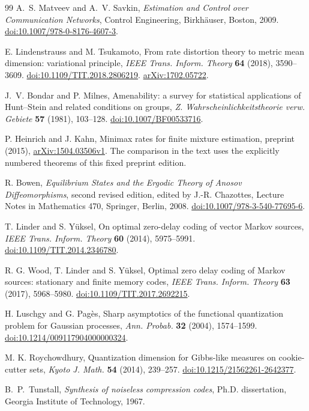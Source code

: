 \begin{thebibliography}{99}
A.~S. Matveev and A.~V. Savkin, \emph{Estimation and Control over
Communication Networks}, Control Engineering, Birkh\"auser, Boston, 2009.
\href{https://doi.org/10.1007/978-0-8176-4607-3}{doi:10.1007/978-0-8176-4607-3}.

E. Lindenstrauss and M. Tsukamoto, From rate distortion theory to
metric mean dimension: variational principle,
\emph{IEEE Trans. Inform. Theory} \textbf{64} (2018), 3590--3609.
\href{https://doi.org/10.1109/TIT.2018.2806219}{doi:10.1109/TIT.2018.2806219}.
\href{https://arxiv.org/abs/1702.05722}{arXiv:1702.05722}.

J.~V. Bondar and P. Milnes, Amenability: a survey for statistical
applications of Hunt--Stein and related conditions on groups,
\emph{Z. Wahrscheinlichkeitstheorie verw. Gebiete} \textbf{57}
(1981), 103--128.
\href{https://doi.org/10.1007/BF00533716}{doi:10.1007/BF00533716}.

P. Heinrich and J. Kahn, Minimax rates for finite mixture estimation,
preprint (2015), \href{https://arxiv.org/abs/1504.03506v1}{arXiv:1504.03506v1}.
The comparison in the text uses the explicitly numbered theorems
of this fixed preprint edition.

R. Bowen, \emph{Equilibrium States and the Ergodic Theory of Anosov
Diffeomorphisms}, second revised edition, edited by J.-R. Chazottes,
Lecture Notes in Mathematics 470, Springer, Berlin, 2008.
\href{https://doi.org/10.1007/978-3-540-77695-6}{doi:10.1007/978-3-540-77695-6}.

T. Linder and S. Y\"uksel, On optimal zero-delay coding of vector
Markov sources, \emph{IEEE Trans. Inform. Theory} \textbf{60}
(2014), 5975--5991.
\href{https://doi.org/10.1109/TIT.2014.2346780}{doi:10.1109/TIT.2014.2346780}.

R. G. Wood, T. Linder and S. Y\"uksel, Optimal zero delay coding of
Markov sources: stationary and finite memory codes,
\emph{IEEE Trans. Inform. Theory} \textbf{63} (2017), 5968--5980.
\href{https://doi.org/10.1109/TIT.2017.2692215}{doi:10.1109/TIT.2017.2692215}.

H. Luschgy and G. Pag\`es, Sharp asymptotics of the functional
quantization problem for Gaussian processes,
\emph{Ann. Probab.} \textbf{32} (2004), 1574--1599.
\href{https://doi.org/10.1214/009117904000000324}{doi:10.1214/009117904000000324}.

M. K. Roychowdhury, Quantization dimension for Gibbs-like measures
on cookie-cutter sets, \emph{Kyoto J. Math.} \textbf{54} (2014),
239--257.
\href{https://doi.org/10.1215/21562261-2642377}{doi:10.1215/21562261-2642377}.

B.~P.~Tunstall, \emph{Synthesis of noiseless compression codes},
Ph.D. dissertation, Georgia Institute of Technology, 1967.

\end{thebibliography}
